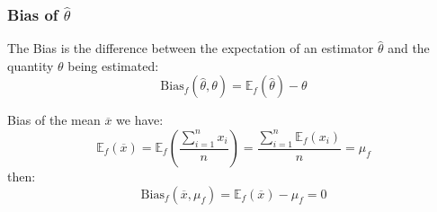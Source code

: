 \frame
{
\frametitle{Bias of $\hat{\theta}$}
\begin{definition}
The \alert{Bias} is the difference between the expectation of an estimator $\hat{\theta}$ and the quantity $\theta$ being estimated:
$$
\mathrm{Bias}_{f}(\hat{\theta},\theta)=\mathbb{E}_f(\hat{\theta})-\theta
$$
\end{definition}


 \begin{exampleblock}{Bias of the mean $\overline{x}$}
we have:
$$
\mathbb{E}_{f}(\overline{x})=\mathbb{E}_{f}\left(\frac{\sum_{i=1}^{n} x_i}{n}\right)=\frac{\sum_{i=1}^{n}\mathbb{E}_{f}( x_i)}{n}=\mu_f
$$
then:
$$
\mathrm{Bias}_{f}(\overline{x},\mu_f)=\mathbb{E}_f(\overline{x})-\mu_f =0
$$
\end{exampleblock}
}
